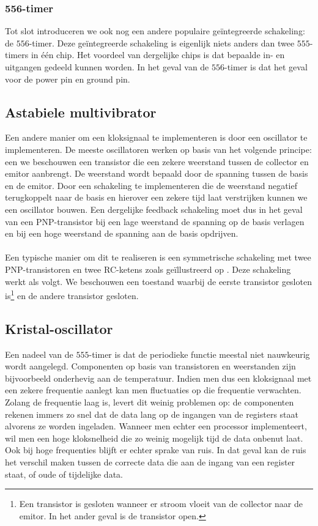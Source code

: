 \subsubsection{556-timer}
Tot slot introduceren we ook nog een andere populaire ge\"integreerde schakeling: de $556$-timer. Deze ge\"integreerde schakeling is eigenlijk niets anders dan twee $555$-timers in \'e\'en chip. Het voordeel van dergelijke chips is dat bepaalde in- en uitgangen gedeeld kunnen worden. In het geval van de $556$-timer is dat het geval voor de power pin en ground pin.
\subsection{Astabiele multivibrator}
Een andere manier om een kloksignaal te implementeren is door een oscillator te implementeren. De meeste oscillatoren werken op basis van het volgende principe: een we beschouwen een transistor die een zekere weerstand tussen de collector en emitor aanbrengt. De weerstand wordt bepaald door de spanning tussen de basis en de emitor. Door een schakeling te implementeren die de weerstand negatief terugkoppelt naar de basis en hierover een zekere tijd laat verstrijken kunnen we een oscillator bouwen. Een dergelijke feedback schakeling moet dus in het geval van een PNP-transistor bij een lage weerstand de spanning op de basis verlagen en bij een hoge weerstand de spanning aan de basis opdrijven.
\paragraph{}
Een typische manier om dit te realiseren is een symmetrische schakeling met twee PNP-transistoren en twee RC-ketens zoals ge\"illustreerd op . Deze schakeling werkt als volgt. We beschouwen een toestand waarbij de eerste transistor gesloten is\footnote{Een transistor is gesloten wanneer er stroom vloeit van de collector naar de emitor. In het ander geval is de transistor open.} en de andere transistor gesloten.
\subsection{Kristal-oscillator}
Een nadeel van de $555$-timer is dat de periodieke functie meestal niet nauwkeurig wordt aangelegd. Componenten op basis van transistoren en weerstanden zijn bijvoorbeeld onderhevig aan de temperatuur. Indien men dus een kloksignaal met een zekere frequentie aanlegt kan men fluctuaties op die frequentie verwachten. Zolang de frequentie laag is, levert dit weinig problemen op: de componenten rekenen immers zo snel dat de data lang op de ingangen van de registers staat alvorens ze worden ingeladen. Wanneer men echter een processor implementeert, wil men een hoge kloksnelheid die zo weinig mogelijk tijd de data onbenut laat. Ook bij hoge frequenties blijft er echter sprake van ruis. In dat geval kan de ruis het verschil maken tussen de correcte data die aan de ingang van een register staat, of oude of tijdelijke data.
